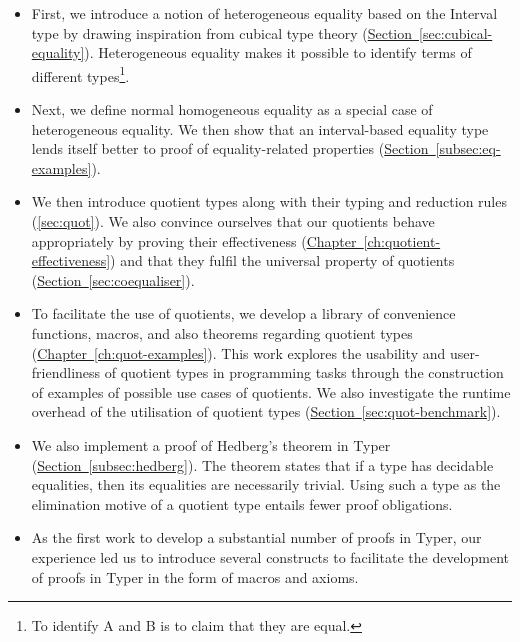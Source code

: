 \documentclass[12pt,twoside,maitrise]{dms}
\theoremstyle{definition}
\numberwithin{equation}{section}
\numberwithin{table}{chapter}
\numberwithin{figure}{chapter}
\begin{document}
\begin{itemize}
  \item{First, we introduce a notion of heterogeneous equality based on the
    Interval type by drawing inspiration from cubical type theory
    (\hyperref[sec:cubical-equality]{Section~\ref*{sec:cubical-equality}}).
    Heterogeneous equality makes it possible to identify terms of different
    types\footnote{To identify A and B is to claim that they are equal.}. }

  \item{Next, we define normal homogeneous equality as a special case of
    heterogeneous equality. We then show that an interval-based equality
    type lends itself better to proof of equality-related properties
    (\hyperref[subsec:eq-examples]{Section~\ref*{subsec:eq-examples}}).}

  \item{We then introduce quotient types along with their typing and reduction
    rules (\autoref{sec:quot}). We also convince ourselves that our quotients
    behave appropriately by proving their effectiveness
    (\hyperref[ch:quotient-effectiveness]{Chapter~\ref*{ch:quotient-effectiveness}})
    and that they fulfil the universal property of quotients
    (\hyperref[sec:coequaliser]{Section~\ref*{sec:coequaliser}}). }

  \item{To facilitate the use of quotients, we develop a library of
    convenience functions, macros, and also theorems regarding quotient types
    (\hyperref[ch:quot-examples]{Chapter~\ref*{ch:quot-examples}}). This work
    explores the usability and user-friendliness of quotient types in
    programming tasks through the construction of examples of possible use cases
    of quotients. We also investigate the runtime overhead of the utilisation of
    quotient types
    (\hyperref[sec:quot-benchmark]{Section~\ref*{sec:quot-benchmark}}).}

  \item{We also implement a proof of Hedberg's
    theorem\cite{hedberg1998coherence} in Typer
    (\hyperref[subsec:hedberg]{Section~\ref*{subsec:hedberg}}). The theorem
    states that if a type has decidable equalities, then its equalities are
    necessarily trivial. Using such a type as the elimination motive of a
    quotient type entails fewer proof obligations. }

  \item{As the first work to develop a substantial number of proofs in Typer,
    our experience led us to introduce several constructs to facilitate the
    development of proofs in Typer in the form of macros and axioms. }
\end{itemize}
\end{document}
